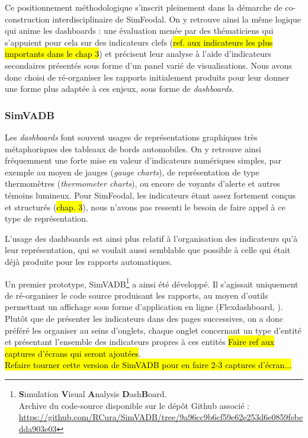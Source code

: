 	Ce positionnement méthodologique s'inscrit pleinement dans la démarche de co-construction interdisciplinaire de SimFeodal.
	On y retrouve ainsi la même logique qui anime les dashboards : une évaluation menée par des thématiciens qui s'appuient pour cela sur des indicateurs clefs (\hl{ref. aux indicateurs les plus importants dans le chap 3}) et précisent leur analyse à l'aide d'indicateurs secondaires présentés sous forme d'un panel varié de visualisations.
	Nous avons donc choisi de ré-organiser les rapports initialement produits pour leur donner une forme plus adaptée à ces enjeux, sous forme de \textit{dashboards}.

	\subsubsection{SimVADB}\label{subsubsec:simvadb}

	Les \textit{dashboards} font souvent usages de représentations graphiques très métaphoriques des tableaux de bords automobiles.
	On y retrouve ainsi fréquemment une forte mise en valeur d'indicateurs numériques simples, par exemple au moyen de jauges (\textit{gauge charts}), de représentation de type thermomètres (\textit{thermometer charts}), ou encore de voyants d'alerte et autres témoins lumineux.
	Pour SimFeodal, les indicateurs étant assez fortement conçus et structurés (\hl{chap. 3}), nous n'avons pas ressenti le besoin de faire appel à ce type de représentation.

	L'usage des dashboards est ainsi plus relatif à l'organisation des indicateurs qu'à leur représentation, qui se voulait aussi semblable que possible à celle qui était déjà produite pour les rapports automatiques.

	Un premier prototype, SimVADB\footnote{
	\textbf{S}imulation \textbf{V}isual \textbf{A}nalysis \textbf{D}ash\textbf{B}oard.\\
	Archive du code-source disponible sur le dépôt Github associé :
	\url{https://github.com/RCura/SimVADB/tree/9a96cc9b6cf59e62e253d6e0859febedda903e03}
	} a ainsi été développé.
	Il s'agissait uniquement de ré-organiser le code source produisant les rapports, au moyen d'outils permettant un affichage sous forme d'application en ligne (Flexdashboard, \autocite{iannone_flexdashboard_2018}).
	Plutôt que de présenter les indicateurs dans des pages successives, on a donc préféré les organiser au seins d'onglets, chaque onglet concernant un type d'entité et présentant l'ensemble des indicateurs propres à ces entités \hl{Faire ref aux captures d'écrans qui seront ajoutées}.\\
	\hl{Refaire tourner cette version de SimVADB pour en faire 2-3 captures d'écran...}\\

